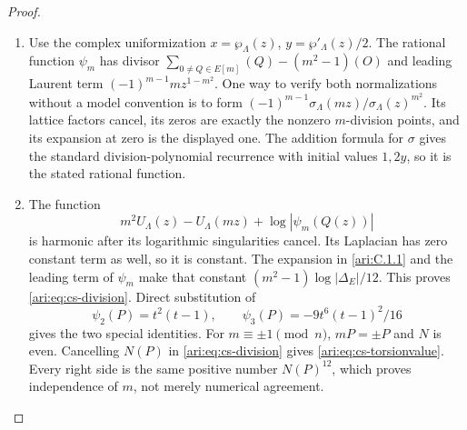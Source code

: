 \begin{proof}
\begin{enumerate}[label=\arabic*.,leftmargin=*]
\item Use the complex uniformization $x=\wp_\Lambda(z)$,
$y=\wp'_\Lambda(z)/2$. The rational function $\psi_m$ has divisor
$\sum_{0\ne Q\in E[m]}(Q)-(m^2-1)(O)$ and leading Laurent term
$(-1)^{m-1}m z^{1-m^2}$. One way to verify both normalizations without
a model convention is to form
$(-1)^{m-1}\sigma_\Lambda(mz)/\sigma_\Lambda(z)^{m^2}$.
Its lattice factors cancel, its zeros are exactly the nonzero
$m$-division points, and its expansion at zero is the displayed
one. The addition formula for $\sigma$ gives the standard
division-polynomial recurrence with initial values $1,2y$, so it is
the stated rational function.

\item The function
\[
 m^2U_\Lambda(z)-U_\Lambda(mz)
                    +\log|\psi_m(Q(z))|
\]
is harmonic after its logarithmic singularities cancel. Its
Laplacian has zero constant term as well, so it is constant.
The expansion in \ref{ari:C.1.1} and the leading term of $\psi_m$ make that
constant $(m^2-1)\log|\Delta_E|/12$. This proves
\eqref{ari:eq:cs-division}. Direct substitution of
\[
 \psi_2(P)=t^2(t-1),\qquad
 \psi_3(P)=-9t^6(t-1)^2/16
\]
gives the two special identities. For $m\equiv\pm1\pmod n$,
$mP=\pm P$ and $N$ is even. Cancelling $N(P)$ in
\eqref{ari:eq:cs-division} gives \eqref{ari:eq:cs-torsionvalue}.
Every right side is the same positive number $N(P)^{12}$, which
proves independence of $m$, not merely numerical agreement.
\end{enumerate}
\end{proof}

